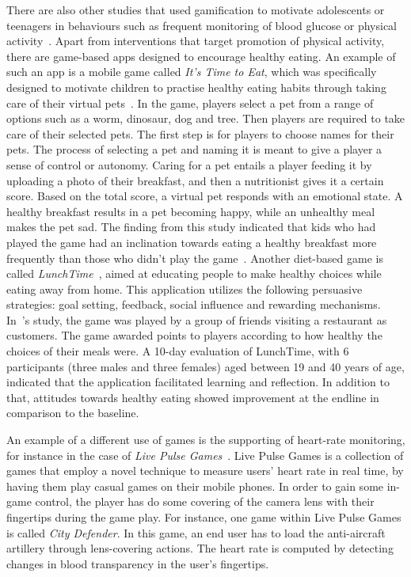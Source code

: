 There are also other studies that used gamification to motivate adolescents or teenagers in behaviours such as frequent monitoring of blood glucose or physical activity~\citep{arteaga2010:persuasive,cafazzo2012:bant}. Apart from interventions that target promotion of physical activity, there are game-based apps designed to encourage healthy eating. An example of such an app is a mobile game called \emph{It's Time to Eat}, which was specifically designed to motivate children to practise healthy eating habits through taking care of their virtual pets~\citep{pollak2010s}. In the game, players select a pet from a range of options such as a worm, dinosaur, dog and tree. Then players are required to take care of their selected pets. The first step is for players to choose names for their pets. The process of selecting a pet and naming it is meant to give a player a sense of control or autonomy. Caring for a pet entails a player feeding it by uploading a photo of their breakfast, and then a nutritionist gives it a certain score. Based on the total score, a virtual pet responds with an emotional state. A healthy breakfast results in a pet becoming happy, while an unhealthy meal makes the pet sad. The finding from this study indicated that kids who had played the game had an inclination towards eating a healthy breakfast more frequently than those who didn't play the game~\citep{pollak2010s}. Another diet-based game is called \emph{LunchTime}~\citep{orji2013lunchtime}, aimed at educating people to make healthy choices while eating away from home. This application utilizes the following persuasive strategies: goal setting, feedback, social influence and rewarding mechanisms. In~\cite{orji2013lunchtime}'s study, the game was played by a group of friends visiting a restaurant as customers. The game awarded points to players according to how healthy the choices of their meals were. A 10-day evaluation  of LunchTime, with 6 participants (three males and three females) aged between 19 and 40 years of age, indicated that the application facilitated learning and reflection. In addition to that, attitudes towards healthy eating showed improvement at the endline in comparison to the baseline. 

An example  of a different use of games is the supporting of heart-rate monitoring, for instance in the case of \emph{Live Pulse Games}~\citep{han2014designing,han2015balancing}. Live Pulse Games is a collection of games that employ a novel technique to measure users' heart rate in real time, by having them play casual games on their mobile phones. In order to gain some in-game control, the player has do some covering of the camera lens with their fingertips during the game play. For instance, one game within Live Pulse Games is called \emph{City Defender}. In this game, an end user has to load the anti-aircraft artillery through lens-covering actions. The heart rate is computed by detecting changes  in  blood transparency in the user's fingertips.
 
